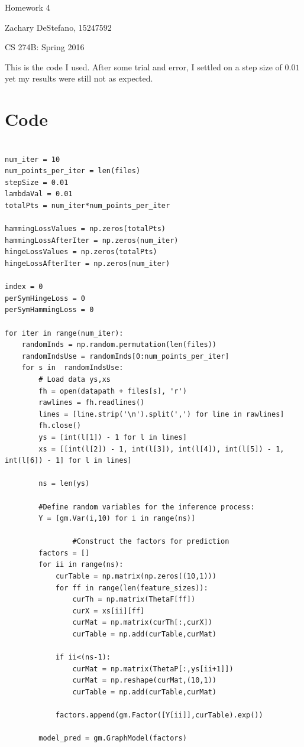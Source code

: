\documentclass[twoside,11pt]{article}
\theoremstyle{definition}
\begin{document}
\centerline{\Large Homework 4}
\centerline{Zachary DeStefano, 15247592}
\centerline{CS 274B: Spring 2016}

This is the code I used. After some trial and error, I settled on a step size of $0.01$ yet my results were still not as expected. 

\section*{Code}


\begin{lstlisting}

num_iter = 10
num_points_per_iter = len(files)
stepSize = 0.01
lambdaVal = 0.01
totalPts = num_iter*num_points_per_iter

hammingLossValues = np.zeros(totalPts)
hammingLossAfterIter = np.zeros(num_iter)
hingeLossValues = np.zeros(totalPts)
hingeLossAfterIter = np.zeros(num_iter)

index = 0
perSymHingeLoss = 0
perSymHammingLoss = 0

for iter in range(num_iter):
    randomInds = np.random.permutation(len(files))
    randomIndsUse = randomInds[0:num_points_per_iter]
    for s in  randomIndsUse:
        # Load data ys,xs
        fh = open(datapath + files[s], 'r')
        rawlines = fh.readlines()
        lines = [line.strip('\n').split(',') for line in rawlines]
        fh.close()
        ys = [int(l[1]) - 1 for l in lines]
        xs = [[int(l[2]) - 1, int(l[3]), int(l[4]), int(l[5]) - 1, int(l[6]) - 1] for l in lines]

        ns = len(ys)

        #Define random variables for the inference process:
        Y = [gm.Var(i,10) for i in range(ns)]

				#Construct the factors for prediction
        factors = []
        for ii in range(ns):
            curTable = np.matrix(np.zeros((10,1)))
            for ff in range(len(feature_sizes)):
                curTh = np.matrix(ThetaF[ff])
                curX = xs[ii][ff]
                curMat = np.matrix(curTh[:,curX])
                curTable = np.add(curTable,curMat)

            if ii<(ns-1):
                curMat = np.matrix(ThetaP[:,ys[ii+1]])
                curMat = np.reshape(curMat,(10,1))
                curTable = np.add(curTable,curMat)
								
            factors.append(gm.Factor([Y[ii]],curTable).exp())

        model_pred = gm.GraphModel(factors)


\end{lstlisting}
\end{document}
